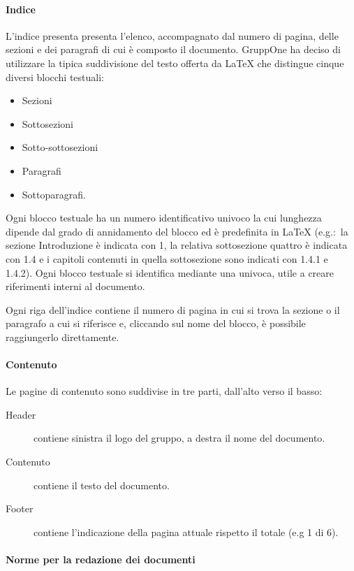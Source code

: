 \documentclass[../../norme-di-progetto.tex]{subfiles}
\begin{document}
\paragraph{Indice}%
\label{par:indice}
L'indice presenta presenta l'elenco, accompagnato dal numero di pagina, delle sezioni e dei paragrafi di cui è composto il documento.
GruppOne ha deciso di utilizzare la tipica suddivisione del testo offerta da \LaTeX{} che distingue cinque diversi blocchi testuali:
\begin{itemize}
  \item Sezioni
  \item Sottosezioni
  \item Sotto-sottosezioni
  \item Paragrafi
  \item Sottoparagrafi.
\end{itemize}

Ogni blocco testuale ha un numero identificativo univoco la cui lunghezza dipende dal grado di annidamento del blocco ed è predefinita in \LaTeX{} (e.g.:\ la sezione Introduzione è indicata con 1, la relativa sottosezione quattro è indicata con 1.4 e i capitoli contenuti in quella sottosezione sono indicati con 1.4.1 e 1.4.2).
Ogni blocco testuale si identifica mediante una  univoca, utile a creare riferimenti interni al documento.

Ogni riga dell'indice contiene il numero di pagina in cui si trova la sezione o il paragrafo a cui si riferisce e, cliccando sul nome del blocco, è possibile raggiungerlo direttamente.

\paragraph{Contenuto}%
\label{par:contenuto}
Le pagine di contenuto sono suddivise in tre parti, dall'alto verso il basso:
\begin{description}
  \item [Header] contiene sinistra il logo del gruppo, a destra il nome del documento.
  \item [Contenuto] contiene il testo del documento.
  \item [Footer] contiene l'indicazione della pagina attuale rispetto il totale (e.g 1 di 6).
\end{description}

\paragraph{Norme per la redazione dei documenti}%
\label{par:norme_per_la_redazione_dei_documenti}
\end{document}
